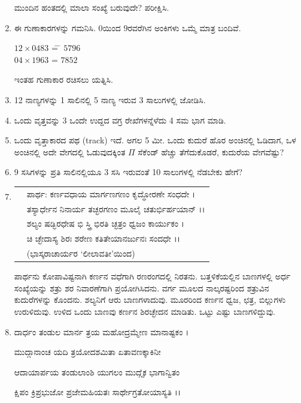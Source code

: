 \begin{enumerate}
ಮುಂದಿನ ಹಂತದಲ್ಲಿ ಮಾಲಾ ಸಂಖ್ಯೆ ಬರುವುದೇ? ಪರೀಕ್ಷಿಸಿ. 

\item ಈ ಗುಣಾಕಾರಗಳನ್ನು ಗಮನಿಸಿ. 0ಯಿಂದ 9ರವರೆಗಿನ ಅಂಕಿಗಳು ಒಮ್ಮೆ ಮಾತ್ರ ಬಂದಿವೆ. 
{\fontsize{11pt}{13pt}\selectfont
\begin{tabbing}
$12\times 0483$ \= = \= $5796$\\
$04\times 1963$ \> =  \> $7852$
\end{tabbing}}\relax
ಇಂತಹ ಗುಣಾಕಾರ ರಚಿಸಲು ಯತ್ನಿಸಿ. 

\item 12 ನಾಣ್ಯಗಳನ್ನು 1 ಸಾಲಿನಲ್ಲಿ 5 ನಾಣ್ಯ ಇರುವ 3 ಸಾಲುಗಳಲ್ಲಿ ಜೋಡಿಸಿ. 

\item ಒಂದು ವೃತ್ತವನ್ನು 3 ಒಂದೇ ಉದ್ದದ ವಗ್ರ ರೇಖೆಗಳನ್ನೆಳೆದು 4 ಸಮ ಭಾಗ ಮಾಡಿ. 

\item ಒಂದು ವೃತ್ತಾಕಾರದ ಪಥ (track) ಇದೆ. ಅಗಲ 5 ಮೀ. ಒಂದು ಕುದುರೆ ಹೊರ ಅಂಚಿನಲ್ಲಿ ಓಡಿದಾಗ, ಒಳ ಅಂಚಿನಲ್ಲಿ ಅದೇ ವೇಗದಲ್ಲಿ ಓಡುವುದಕ್ಕಿಂತ $\Pi$ ಸೆಕೆಂಡ್ ಹೆಚ್ಚು ತೆಗೆದುಕೊಡರೆ, ಕುದುರೆಯ ವೇಗವೆಷ್ಟು? 

\item 9 ಸಸಿಗಳನ್ನು ಪ್ರತಿ ಸಾಲಿನಲ್ಲಿಯೂ 3 ಸಸಿ ಇರುವಂತೆ 10 ಸಾಲುಗಳಲ್ಲಿ ನೆಡಬೇಕು ಹೇಗೆ? 

\item 
\begin{tabular}[t]{ll}
&ಪಾರ್ಥ: ಕರ್ಣವಧಾಯ ಮಾರ್ಗಣಗಣಂ ಕೃದ್ಧೋರಣೇ ಸಂಧದೇ ।\\
&ತಸ್ಯಾರ್ಧೇನ ನಿನಾರ್ಯ ತಚ್ಛರಗಣಂ ಮೂಲೈ ಚತುರ್ಭಿರ್ಹಯಾನ್ ।।\\
&ಶಲ್ಯಂ ಷಡ್ಭಿರಧೇಷ ಭಿ ಸ್ತ್ರಿ ಭಿರತಿ ಚ್ಛತ್ರಂ ಧ್ವಜಂ ಕಾರ್ಯುಕಂ ।\\
&ಚಿ ಚ್ಛೇದಾಸ್ಯ ಶಿರಃ ಶರೇಣ ಕತಿತೇಯಾನರ್ಜುನಃ ಸಂದಧೇ ।।\\
&\hfill{(ಭಾಸ್ಕರಾಚಾರ್ಯರ `ಲೀಲಾವತೀ'ಯಿಂದ)}
\end{tabular}

\vfill\eject

ಪಾರ್ಥನು ಕೋಪಾವಿಷ್ಟನಾಗಿ ಕರ್ಣನ ವಧೆಗಾಗಿ ರಣರಂಗದಲ್ಲಿ ನಿರತನು. ಬತ್ತಳಿಕೆಯಲ್ಲಿನ ಬಾಣಗಳಲ್ಲಿ ಅರ್ಧ ಸಂಖ್ಯೆಯನ್ನು ಶತ್ರು ಶರ ನಿವಾರಣೆಗಾಗಿ ಪ್ರಯೋಗಿಸಿದನು. ವರ್ಗ ಮೂಲದ ನಾಲ್ಕರಷ್ಟರಿಂದ ಶತ್ರುವಿನ ಕುದುರೆಗಳನ್ನು ಕೊಂದನು. ಶಲ್ಯನಿಗೆ ಆರು ಬಾಣಗಳಾದುವು. ಮೂರರಿಂದ ಕರ್ಣನ ಧ್ವಜ, ಛತ್ರ, ಬಿಲ್ಲುಗಳು ಉರುಳಿದುವು. ಉಳಿದ ಒಂದು ಬಾಣವು ಕರ್ಣನ ಶಿರಚ್ಛೇದನ ಮಾಡಿತು. ಒಟ್ಟು ಎಷ್ಟು ಬಾಣಗಳಿದ್ದುವು. 

\item ದಾರ್ಧಂ ತಂಡುಲ ಮಾರ್ನ ತ್ರಯ ಮಹೋದ್ರಮ್ಮೇಣ ಮಾನಾಷ್ಟಕಂ ।

ಮುದ್ಗಾನಾಂಚ ಯದಿ ತ್ರಯೋದಶಮಿತಾ ಏತಾವಣಕ್ಕಾಕಿನೀ 

ಆದಾಯಾರ್ಪಯ ತಂಡುಲಾಂಶಿ ಯುಗಲಂ ಮುದ್ಗೈಕ ಭಾಗಾನ್ವಿತಂ 

ಕ್ಷಿಪಂ ಕ್ರಿಪ್ರಭುಜೋ ಪ್ರಜೇಮಹಿಯತಃ ಸಾರ್ಥೇಗ್ರತೋಯಾಸ್ಯತಿ ।।


\end{enumerate}
